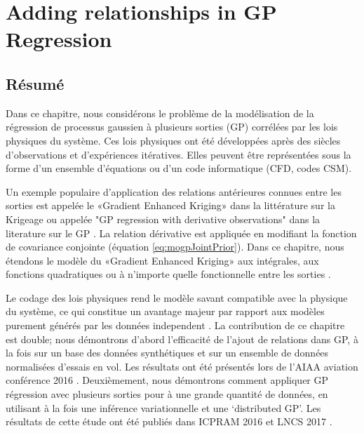 \chapter{Adding relationships in GP Regression}
\label{chapAddingEquationsInGP}

\begin{mdframed}[hidealllines=true,backgroundcolor=lightgray!20]
\section*{Résumé}
Dans ce chapitre, nous considérons le problème de la modélisation de la régression de processus gaussien à plusieurs sorties (GP) corrélées par les lois physiques du système. Ces lois physiques ont été développées après des siècles d'observations et d'expériences itératives. Elles peuvent être représentées sous la forme d'un ensemble d'équations ou d'un code informatique (CFD, codes CSM).

Un exemple populaire d'application des relations antérieures connues entre les sorties est appelée le «Gradient Enhanced Kriging» dans la littérature sur la Krigeage  \cite{chung2002using, morris1993bayesian, forrester2009recent} ou appelée "GP regression with derivative observations" dans la literature sur le GP \cite{NIPSDerivativeGP}. La relation dérivative est appliquée en modifiant la fonction de covariance conjointe (équation \ref{eq:mogpJointPrior}). Dans ce chapitre, nous étendons le modèle du «Gradient Enhanced Kriging» aux intégrales, aux fonctions quadratiques ou à n’importe quelle fonctionnelle entre les sorties \cite{ Constantinescu2013}.

Le codage des lois physiques rend le modèle savant compatible avec la physique du système, ce qui constitue un avantage majeur par rapport aux modèles purement générés par les données independent \cite{jazwinski2007stochastic}. La contribution de ce chapitre est double; nous démontrons d'abord l'efficacité de l'ajout de relations dans GP, à la fois sur un base des données  synthétiques et sur un ensemble de données normalisées d'essais en vol. Les résultats ont été présentés lors de l'AIAA aviation conférence 2016 \cite{oatao18001}. Deuxièmement, nous démontrons comment appliquer GP régression avec plusieurs sorties pour à une grande quantité de données, en utilisant à la fois une inférence variationnelle et une `distributed GP’. Les résultats de cette étude ont été publiés dans ICPRAM 2016 et LNCS 2017 \cite{icpram16Ankit, oatao18000}.
\end{mdframed}


